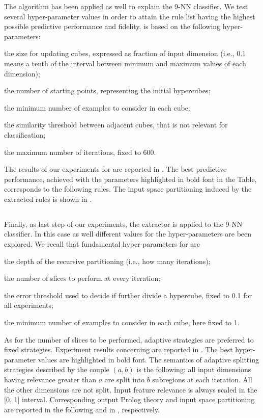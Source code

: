 \documentclass[
]{ceurart}
\begin{document}
The \iter{} algorithm has been applied as well to explain the 9-NN classifier.
%
We test several hyper-parameter values in order to attain the rule list having the highest possible predictive performance and fidelity.
%
\iter{} is based on the following hyper-parameters:
%
\begin{inlinelist}
	\item the size for updating cubes, expressed as fraction of input dimension (i.e., 0.1 means a tenth of the interval between minimum and maximum values of each dimension);
	\item the number of starting points, representing the initial hypercubes;
	\item the minimum number of examples to consider in each cube;
	\item the similarity threshold between adjacent cubes, that is not relevant for classification;
	\item the maximum number of iterations, fixed to 600.
\end{inlinelist}

The results of our experiments for \iter{} are reported in .
%
The best predictive performance, achieved with the parameters highlighted in bold font in the Table, corresponds to the following rules.
%
%
The input space partitioning induced by the extracted rules is shown in .

\subsection{\gridex{}}



Finally, as last step of our experiments, the \gridex{} extractor is applied to the 9-NN classifier.
%
In this case as well different values for the hyper-parameters are been explored.
%
We recall that fundamental hyper-parameters for \gridex{} are
%
\begin{inlinelist}
	\item the depth of the recursive partitioning (i.e., how many iterations);
	\item the number of slices to perform at every iteration;
	\item the error threshold used to decide if further divide a hypercube, fixed to 0.1 for all experiments;
	\item the minimum number of examples to consider in each cube, here fixed to 1.
\end{inlinelist}
%
As for the number of slices to be performed, adaptive strategies are preferred to fixed strategies.
%
Experiment results concerning \gridex{} are reported in .
%
The best hyper-parameter values are highlighted in bold font.
%
The semantics of adaptive splitting strategies described by the couple $(a, b)$ is the following: all input dimensions having relevance greater than $a$ are split into $b$ subregions at each iteration.
%
All the other dimensions are not split.
%
Input feature relevance is always scaled in the [0, 1] interval.
%
Corresponding output Prolog theory and input space partitioning are reported in the following and in , respectively.
\end{document}
